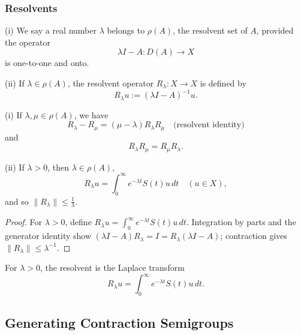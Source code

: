 \subsubsection{Resolvents}

\begin{definition}
\label{def:resolvent-set-operator}

(i) We say a real number $\lambda$ belongs to $\rho(A)$, the resolvent set of $A$, provided the operator
\[
\lambda I - A : D(A) \to X
\]
is one-to-one and onto.

(ii) If $\lambda \in \rho(A)$, the resolvent operator $R_\lambda : X \to X$ is defined by
\[
R_\lambda u := (\lambda I - A)^{-1}u.
\]
\end{definition}

\begin{theorem}
\label{thm:resolvent-operator-properties}

(i) If $\lambda, \mu \in \rho(A)$, we have
\[
R_\lambda - R_\mu = (\mu - \lambda)R_\lambda R_\mu \quad \text{(resolvent identity)}
\tag{12}
\]
and
\[
R_\lambda R_\mu = R_\mu R_\lambda.
\tag{13}
\]

(ii) If $\lambda > 0$, then $\lambda \in \rho(A)$,
\[
R_\lambda u = \int_0^\infty e^{-\lambda t}S(t)u \, dt \quad (u \in X),
\tag{14}
\]
and so $\|R_\lambda\| \leq \frac{1}{\lambda}$.
\end{theorem}

\begin{proof}
\sketch For $\lambda>0$, define $R_\lambda u=\int_0^\infty e^{-\lambda t}S(t)u\,dt$. Integration by parts and the generator identity show $(\lambda I-A)R_\lambda=I=R_\lambda(\lambda I-A)$; contraction gives $\|R_\lambda\|\le\lambda^{-1}$.
\end{proof}

\begin{remark}
\label{rem:resolvent-laplace-transform-semigroup}

For $\lambda>0$, the resolvent is the Laplace transform
\[
R_\lambda u=\int_0^\infty e^{-\lambda t}S(t)u\,dt.
\]
\end{remark}

\subsection{Generating Contraction Semigroups}
\label{sec:generating-contraction-semigroups}

